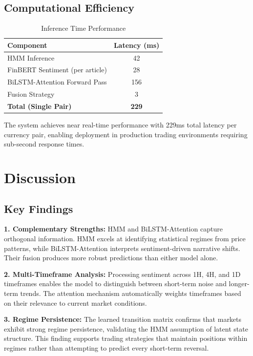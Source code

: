 \documentclass[conference]{IEEEtran}
\begin{document}
\subsection{Computational Efficiency}

\begin{table}[htbp]
\centering
\caption{Inference Time Performance}
\label{tab:timing}
\begin{tabular}{lc}
\toprule
\textbf{Component} & \textbf{Latency (ms)} \\
\midrule
HMM Inference & 42 \\
FinBERT Sentiment (per article) & 28 \\
BiLSTM-Attention Forward Pass & 156 \\
Fusion Strategy & 3 \\
\textbf{Total (Single Pair)} & \textbf{229} \\
\bottomrule
\end{tabular}
\end{table}

The system achieves near real-time performance with 229ms total latency per currency pair, enabling deployment in production trading environments requiring sub-second response times.

\section{Discussion}

\subsection{Key Findings}

\textbf{1. Complementary Strengths:} HMM and BiLSTM-Attention capture orthogonal information. HMM excels at identifying statistical regimes from price patterns, while BiLSTM-Attention interprets sentiment-driven narrative shifts. Their fusion produces more robust predictions than either model alone.

\textbf{2. Multi-Timeframe Analysis:} Processing sentiment across 1H, 4H, and 1D timeframes enables the model to distinguish between short-term noise and longer-term trends. The attention mechanism automatically weights timeframes based on their relevance to current market conditions.

\textbf{3. Regime Persistence:} The learned transition matrix confirms that markets exhibit strong regime persistence, validating the HMM assumption of latent state structure. This finding supports trading strategies that maintain positions within regimes rather than attempting to predict every short-term reversal.
\end{document}
